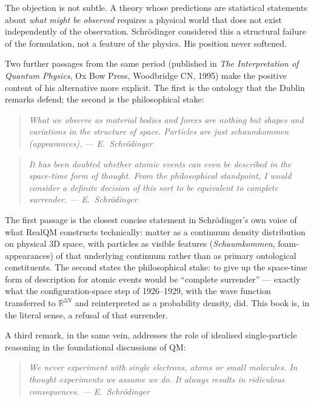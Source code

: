 The objection is not subtle. A theory whose predictions are statistical statements about \emph{what might be observed} requires a physical world that does not exist independently of the observation. Schr\"odinger considered this a structural failure of the formulation, not a feature of the physics. His position never softened.

Two further passages from the same period (published in \emph{The Interpretation of Quantum Physics}, Ox Bow Press, Woodbridge CN, 1995) make the positive content of his alternative more explicit. The first is the ontology that the Dublin remarks defend; the second is the philosophical stake:

\begin{quote}
\itshape What we observe as material bodies and forces are nothing but shapes and variations in the structure of space. Particles are just schaumkommen (appearances). \normalfont\hfill --- E.~Schr\"odinger
\end{quote}

\begin{quote}
\itshape It has been doubted whether atomic events can even be described in the space-time form of thought. From the philosophical standpoint, I would consider a definite decision of this sort to be equivalent to complete surrender. \normalfont\hfill --- E.~Schr\"odinger
\end{quote}

The first passage is the closest concise statement in Schr\"odinger's own voice of what RealQM constructs technically: matter as a continuum density distribution on physical 3D space, with particles as visible features (\emph{Schaumkommen}, foam-appearances) of that underlying continuum rather than as primary ontological constituents. The second states the philosophical stake: to give up the space-time form of description for atomic events would be ``complete surrender'' --- exactly what the configuration-space step of 1926--1929, with the wave function transferred to $\mathbb{R}^{3N}$ and reinterpreted as a probability density, did. This book is, in the literal sense, a refusal of that surrender.

A third remark, in the same vein, addresses the role of idealised single-particle reasoning in the foundational discussions of QM:

\begin{quote}
\itshape We never experiment with single electrons, atoms or small molecules. In thought experiments we assume we do. It always results in ridiculous consequences. \normalfont\hfill --- E.~Schr\"odinger
\end{quote}

